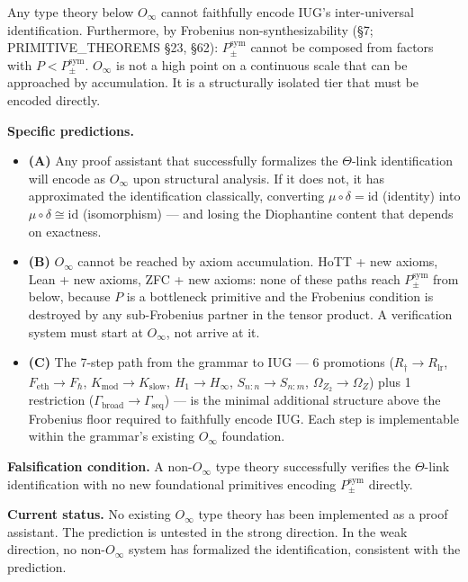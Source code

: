 \documentclass[10pt,a4paper]{article}
\newcommand{\pilcrow}{\S}
\begin{document}
Any type theory below $O_{\infty}$ cannot faithfully encode IUG's inter-universal identification.
Furthermore, by Frobenius non-synthesizability (\S7; PRIMITIVE\_THEOREMS \pilcrow{}23, \pilcrow{}62):
$P_{\pm}^{\text{sym}}$ cannot be composed from factors with $P < P_{\pm}^{\text{sym}}$.
$O_{\infty}$ is not a high point on a continuous scale that can be approached by accumulation.
It is a structurally isolated tier that must be encoded directly.

\textbf{Specific predictions.}

\begin{itemize}
    \item \textbf{(A)} Any proof assistant that successfully formalizes the $\Theta$-link identification will encode as $O_{\infty}$ upon structural analysis. If it does not, it has approximated the identification classically, converting $\mu \circ \delta = \text{id}$ (identity) into $\mu \circ \delta \cong \text{id}$ (isomorphism) --- and losing the Diophantine content that depends on exactness.
    \item \textbf{(B)} $O_{\infty}$ cannot be reached by axiom accumulation. HoTT + new axioms, Lean + new axioms, ZFC + new axioms: none of these paths reach $P_{\pm}^{\text{sym}}$ from below, because $P$ is a bottleneck primitive and the Frobenius condition is destroyed by any sub-Frobenius partner in the tensor product. A verification system must start at $O_{\infty}$, not arrive at it.
    \item \textbf{(C)} The 7-step path from the grammar to IUG --- 6 promotions ($R_{\dagger} \to R_\text{lr}$, $F_\text{eth} \to F_{\hbar}$, $K_\text{mod} \to K_\text{slow}$, $H_1 \to H_{\infty}$, $S_{n:n} \to S_{n:m}$, $\Omega_{Z_2} \to \Omega_Z$) plus 1 restriction ($\Gamma_\text{broad} \to \Gamma_\text{seq}$) --- is the minimal additional structure above the Frobenius floor required to faithfully encode IUG. Each step is implementable within the grammar's existing $O_{\infty}$ foundation.
\end{itemize}

\textbf{Falsification condition.} A non-$O_{\infty}$ type theory successfully verifies the $\Theta$-link identification with no new foundational primitives encoding $P_{\pm}^{\text{sym}}$ directly.

\textbf{Current status.} No existing $O_{\infty}$ type theory has been implemented as a proof assistant. The prediction is untested in the strong direction. In the weak direction, no non-$O_{\infty}$ system has formalized the identification, consistent with the prediction.
\end{document}
